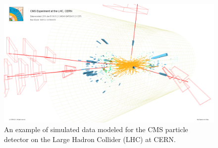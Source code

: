 \begin{figure}
\centering
\includegraphics[scale= 0.4]{../Cap1/650px-CMS_Higgs-event}
\caption{An example of simulated data modeled for the CMS particle detector on the Large Hadron Collider (LHC) at CERN.}
\label{650px-CMS_Higgs-event}
\end{figure}  

